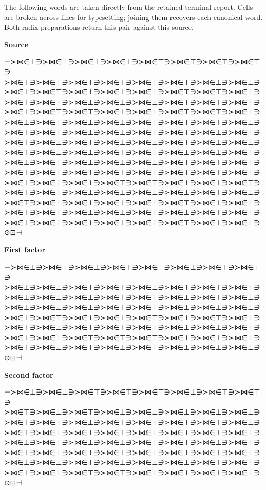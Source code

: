 \documentclass[12pt]{article}
\begin{document}
The following words are taken directly from the retained terminal report. Cells are broken across lines for typesetting; joining them recovers each canonical word. Both radix preparations return this pair against this source.

\noindent\textbf{Source}
\begin{flushleft}\small
⊢≻⋈∈⊥∋≻⋈∈⊥∋≻⋈∈⊥∋≻⋈∈⊥∋≻⋈∈⊤∋≻⋈∈⊤∋≻⋈∈⊤∋≻⋈∈⊤∋\\
≻⋈∈⊤∋≻⋈∈⊤∋≻⋈∈⊤∋≻⋈∈⊤∋≻⋈∈⊤∋≻⋈∈⊤∋≻⋈∈⊥∋≻⋈∈⊥∋\\
≻⋈∈⊥∋≻⋈∈⊤∋≻⋈∈⊥∋≻⋈∈⊥∋≻⋈∈⊥∋≻⋈∈⊤∋≻⋈∈⊤∋≻⋈∈⊥∋\\
≻⋈∈⊤∋≻⋈∈⊤∋≻⋈∈⊥∋≻⋈∈⊥∋≻⋈∈⊥∋≻⋈∈⊤∋≻⋈∈⊤∋≻⋈∈⊤∋\\
≻⋈∈⊥∋≻⋈∈⊤∋≻⋈∈⊤∋≻⋈∈⊥∋≻⋈∈⊥∋≻⋈∈⊤∋≻⋈∈⊤∋≻⋈∈⊥∋\\
≻⋈∈⊥∋≻⋈∈⊤∋≻⋈∈⊥∋≻⋈∈⊥∋≻⋈∈⊤∋≻⋈∈⊤∋≻⋈∈⊤∋≻⋈∈⊥∋\\
≻⋈∈⊤∋≻⋈∈⊤∋≻⋈∈⊥∋≻⋈∈⊥∋≻⋈∈⊤∋≻⋈∈⊤∋≻⋈∈⊥∋≻⋈∈⊤∋\\
≻⋈∈⊤∋≻⋈∈⊥∋≻⋈∈⊤∋≻⋈∈⊥∋≻⋈∈⊥∋≻⋈∈⊤∋≻⋈∈⊥∋≻⋈∈⊥∋\\
≻⋈∈⊤∋≻⋈∈⊥∋≻⋈∈⊥∋≻⋈∈⊤∋≻⋈∈⊤∋≻⋈∈⊥∋≻⋈∈⊥∋≻⋈∈⊤∋\\
≻⋈∈⊥∋≻⋈∈⊤∋≻⋈∈⊥∋≻⋈∈⊥∋≻⋈∈⊥∋≻⋈∈⊤∋≻⋈∈⊤∋≻⋈∈⊤∋\\
≻⋈∈⊤∋≻⋈∈⊤∋≻⋈∈⊤∋≻⋈∈⊤∋≻⋈∈⊤∋≻⋈∈⊤∋≻⋈∈⊤∋≻⋈∈⊤∋\\
≻⋈∈⊥∋≻⋈∈⊥∋≻⋈∈⊥∋≻⋈∈⊤∋≻⋈∈⊤∋≻⋈∈⊥∋≻⋈∈⊥∋≻⋈∈⊤∋\\
≻⋈∈⊤∋≻⋈∈⊤∋≻⋈∈⊥∋≻⋈∈⊥∋≻⋈∈⊥∋≻⋈∈⊥∋≻⋈∈⊤∋≻⋈∈⊥∋\\
≻⋈∈⊤∋≻⋈∈⊥∋≻⋈∈⊥∋≻⋈∈⊥∋≻⋈∈⊥∋≻⋈∈⊤∋≻⋈∈⊥∋≻⋈∈⊥∋\\
≻⋈∈⊤∋≻⋈∈⊤∋≻⋈∈⊥∋≻⋈∈⊥∋≻⋈∈⊤∋≻⋈∈⊥∋≻⋈∈⊤∋≻⋈∈⊤∋\\
≻⋈∈⊥∋≻⋈∈⊥∋≻⋈∈⊥∋≻⋈∈⊥∋≻⋈∈⊥∋≻⋈∈⊤∋≻⋈∈⊥∋≻⋈∈⊥∋⊙⊡⊣
\end{flushleft}

\noindent\textbf{First factor}
\begin{flushleft}\small
⊢≻⋈∈⊥∋≻⋈∈⊤∋≻⋈∈⊥∋≻⋈∈⊤∋≻⋈∈⊤∋≻⋈∈⊥∋≻⋈∈⊤∋≻⋈∈⊤∋\\
≻⋈∈⊥∋≻⋈∈⊥∋≻⋈∈⊤∋≻⋈∈⊤∋≻⋈∈⊥∋≻⋈∈⊤∋≻⋈∈⊤∋≻⋈∈⊤∋\\
≻⋈∈⊥∋≻⋈∈⊥∋≻⋈∈⊥∋≻⋈∈⊤∋≻⋈∈⊤∋≻⋈∈⊥∋≻⋈∈⊤∋≻⋈∈⊥∋\\
≻⋈∈⊥∋≻⋈∈⊥∋≻⋈∈⊥∋≻⋈∈⊤∋≻⋈∈⊤∋≻⋈∈⊥∋≻⋈∈⊥∋≻⋈∈⊥∋\\
≻⋈∈⊥∋≻⋈∈⊤∋≻⋈∈⊥∋≻⋈∈⊥∋≻⋈∈⊤∋≻⋈∈⊥∋≻⋈∈⊤∋≻⋈∈⊥∋\\
≻⋈∈⊤∋≻⋈∈⊥∋≻⋈∈⊤∋≻⋈∈⊤∋≻⋈∈⊤∋≻⋈∈⊥∋≻⋈∈⊥∋≻⋈∈⊤∋\\
≻⋈∈⊥∋≻⋈∈⊥∋≻⋈∈⊤∋≻⋈∈⊤∋≻⋈∈⊤∋≻⋈∈⊥∋≻⋈∈⊥∋≻⋈∈⊥∋\\
≻⋈∈⊤∋≻⋈∈⊥∋≻⋈∈⊤∋≻⋈∈⊥∋≻⋈∈⊤∋≻⋈∈⊥∋≻⋈∈⊥∋≻⋈∈⊥∋⊙⊡⊣
\end{flushleft}

\noindent\textbf{Second factor}
\begin{flushleft}\small
⊢≻⋈∈⊥∋≻⋈∈⊥∋≻⋈∈⊤∋≻⋈∈⊤∋≻⋈∈⊤∋≻⋈∈⊥∋≻⋈∈⊤∋≻⋈∈⊤∋\\
≻⋈∈⊤∋≻⋈∈⊥∋≻⋈∈⊤∋≻⋈∈⊥∋≻⋈∈⊥∋≻⋈∈⊥∋≻⋈∈⊥∋≻⋈∈⊥∋\\
≻⋈∈⊤∋≻⋈∈⊤∋≻⋈∈⊥∋≻⋈∈⊤∋≻⋈∈⊤∋≻⋈∈⊤∋≻⋈∈⊤∋≻⋈∈⊥∋\\
≻⋈∈⊥∋≻⋈∈⊤∋≻⋈∈⊥∋≻⋈∈⊤∋≻⋈∈⊥∋≻⋈∈⊥∋≻⋈∈⊥∋≻⋈∈⊥∋\\
≻⋈∈⊥∋≻⋈∈⊤∋≻⋈∈⊥∋≻⋈∈⊥∋≻⋈∈⊤∋≻⋈∈⊤∋≻⋈∈⊥∋≻⋈∈⊤∋\\
≻⋈∈⊤∋≻⋈∈⊥∋≻⋈∈⊤∋≻⋈∈⊥∋≻⋈∈⊥∋≻⋈∈⊥∋≻⋈∈⊥∋≻⋈∈⊥∋\\
≻⋈∈⊥∋≻⋈∈⊥∋≻⋈∈⊤∋≻⋈∈⊥∋≻⋈∈⊥∋≻⋈∈⊥∋≻⋈∈⊤∋≻⋈∈⊤∋\\
≻⋈∈⊥∋≻⋈∈⊥∋≻⋈∈⊤∋≻⋈∈⊤∋≻⋈∈⊥∋≻⋈∈⊥∋≻⋈∈⊥∋≻⋈∈⊥∋⊙⊡⊣
\end{flushleft}
\end{document}
